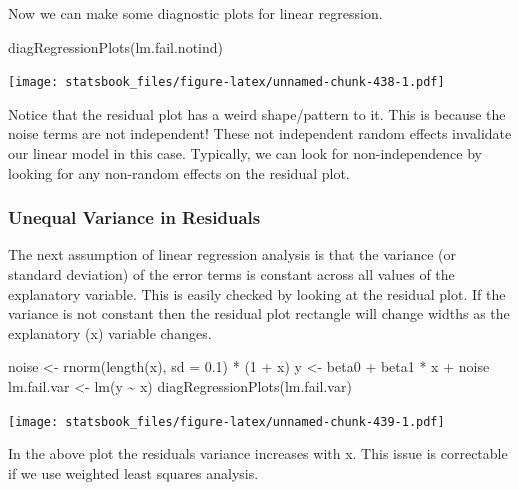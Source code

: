 \documentclass[
]{book}
\newenvironment{Shaded}{\begin{snugshade}}{\end{snugshade}}
\newcommand{\AttributeTok}[1]{\textcolor[rgb]{0.77,0.63,0.00}{#1}}
\newcommand{\DecValTok}[1]{\textcolor[rgb]{0.00,0.00,0.81}{#1}}
\newcommand{\FloatTok}[1]{\textcolor[rgb]{0.00,0.00,0.81}{#1}}
\newcommand{\FunctionTok}[1]{\textcolor[rgb]{0.00,0.00,0.00}{#1}}
\newcommand{\NormalTok}[1]{#1}
\newcommand{\OtherTok}[1]{\textcolor[rgb]{0.56,0.35,0.01}{#1}}
\newcommand{\SpecialCharTok}[1]{\textcolor[rgb]{0.00,0.00,0.00}{#1}}
\theoremstyle{definition}
\theoremstyle{definition}
\theoremstyle{definition}
\theoremstyle{definition}
\theoremstyle{remark}
\begin{document}
Now we can make some diagnostic plots for linear regression.

\begin{Shaded}
\begin{Highlighting}[]
\FunctionTok{diagRegressionPlots}\NormalTok{(lm.fail.notind)}
\end{Highlighting}
\end{Shaded}

\texttt{[image: statsbook\_files/figure-latex/unnamed-chunk-438-1.pdf]}

Notice that the residual plot has a weird shape/pattern to it. This is because the noise terms are not independent! These not independent random effects invalidate our linear model in this case. Typically, we can look for non-independence by looking for any non-random effects on the residual plot.

\hypertarget{unequal-variance-in-residuals}{%
\subsubsection{Unequal Variance in Residuals}\label{unequal-variance-in-residuals}}

The next assumption of linear regression analysis is that the variance (or standard deviation) of the error terms is constant across all values of the explanatory variable. This is easily checked by looking at the residual plot. If the variance is not constant then the residual plot rectangle will change widths as the explanatory (x) variable changes.

\begin{Shaded}
\begin{Highlighting}[]
\NormalTok{noise }\OtherTok{\textless{}{-}} \FunctionTok{rnorm}\NormalTok{(}\FunctionTok{length}\NormalTok{(x), }\AttributeTok{sd =} \FloatTok{0.1}\NormalTok{) }\SpecialCharTok{*}\NormalTok{ (}\DecValTok{1} \SpecialCharTok{+}\NormalTok{ x)}
\NormalTok{y }\OtherTok{\textless{}{-}}\NormalTok{ beta0 }\SpecialCharTok{+}\NormalTok{ beta1 }\SpecialCharTok{*}\NormalTok{ x }\SpecialCharTok{+}\NormalTok{ noise}
\NormalTok{lm.fail.var }\OtherTok{\textless{}{-}} \FunctionTok{lm}\NormalTok{(y }\SpecialCharTok{\textasciitilde{}}\NormalTok{ x)}
\FunctionTok{diagRegressionPlots}\NormalTok{(lm.fail.var)}
\end{Highlighting}
\end{Shaded}

\texttt{[image: statsbook\_files/figure-latex/unnamed-chunk-439-1.pdf]}

In the above plot the residuals variance increases with x. This issue is correctable if we use weighted least squares analysis.
\end{document}
